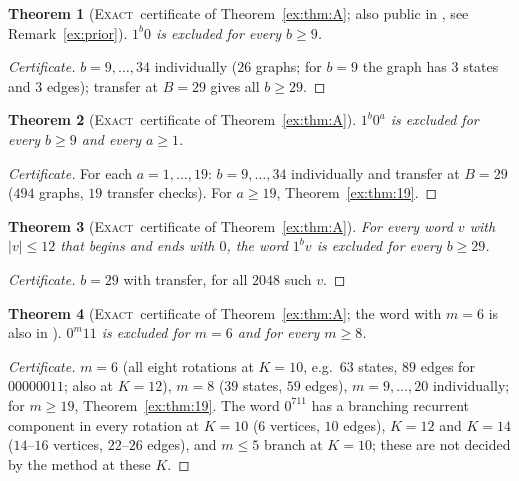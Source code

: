 \documentclass[11pt]{article}
\newtheorem{theorem}{Theorem}[section]
\theoremstyle{definition}
\theoremstyle{remark}
\newcommand{\EXACT}{\textsc{Exact}}
\begin{document}
\begin{theorem}[\EXACT\ certificate of Theorem~\ref{ex:thm:A}; also public in \cite{Cochon}, see Remark~\ref{ex:prior}]\label{ex:thm:1b0}
$1^b0$ is excluded for every $b\ge9$.
\end{theorem}
\begin{proof}[Certificate]
$b=9,\dots,34$ individually ($26$ graphs; for $b=9$ the graph has $3$ states and $3$ edges); transfer at $B=29$ gives all $b\ge29$.
\end{proof}

\begin{theorem}[\EXACT\ certificate of Theorem~\ref{ex:thm:A}]\label{ex:thm:1b0a}
$1^b0^a$ is excluded for every $b\ge9$ and every $a\ge1$.
\end{theorem}
\begin{proof}[Certificate]
For each $a=1,\dots,19$: $b=9,\dots,34$ individually and transfer at $B=29$ ($494$ graphs, $19$ transfer checks). For $a\ge19$, Theorem~\ref{ex:thm:19}.
\end{proof}

\begin{theorem}[\EXACT\ certificate of Theorem~\ref{ex:thm:A}]\label{ex:thm:1bv}
For every word $v$ with $|v|\le12$ that begins and ends with $0$, the word $1^bv$ is excluded for every $b\ge29$.
\end{theorem}
\begin{proof}[Certificate]
$b=29$ with transfer, for all $2048$ such $v$.
\end{proof}

\begin{theorem}[\EXACT\ certificate of Theorem~\ref{ex:thm:A}; the word with $m=6$ is also in \cite{Cochon}]\label{ex:thm:0m11}
$0^m11$ is excluded for $m=6$ and for every $m\ge8$.
\end{theorem}
\begin{proof}[Certificate]
$m=6$ (all eight rotations at $K=10$, e.g.\ $63$ states, $89$ edges for $00000011$; also at $K=12$), $m=8$ ($39$ states, $59$ edges), $m=9,\dots,20$ individually; for $m\ge19$, Theorem~\ref{ex:thm:19}. The word $0^711$ has a branching recurrent component in every rotation at $K=10$ ($6$ vertices, $10$ edges), $K=12$ and $K=14$ ($14$--$16$ vertices, $22$--$26$ edges), and $m\le5$ branch at $K=10$; these are not decided by the method at these $K$.
\end{proof}
\end{document}
